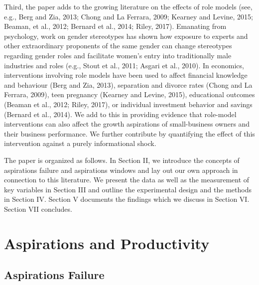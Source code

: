 \documentclass[11.5pt]{article}
\begin{document}
Third, the paper adds to the growing literature on the effects of role models (see, e.g., Berg and Zia, 2013; Chong and La Ferrara, 2009; Kearney and Levine, 2015; Beaman, et al., 2012; Bernard et al., 2014; Riley, 2017). Emanating from psychology, work on gender stereotypes has shown how exposure to experts and other extraordinary proponents of the same gender  can change stereotypes regarding gender roles and facilitate women's entry into traditionally male industries and roles (e.g., Stout et al., 2011; Asgari et al., 2010). In economics, interventions involving role models have been used to affect financial knowledge and behaviour (Berg and Zia, 2013), separation and divorce rates (Chong and La Ferrara, 2009), teen pregnancy (Kearney and Levine, 2015), educational outcomes (Beaman et al., 2012; Riley, 2017), or individual investment behavior and savings (Bernard et al., 2014). We add to this in providing evidence that role-model interventions can also affect the growth aspirations of small-business owners and their business performance. We further contribute by quantifying the effect of this intervention against a purely informational shock.

The paper is organized as follows. In Section II, we introduce the concepts of aspirations failure and aspirations windows and lay out our own approach in connection to this literature. We present the data as well as the measurement of key variables in Section III and outline the experimental design and the methods in Section IV. Section V documents the findings which we discuss in Section VI. Section VII concludes.

\section{Aspirations and Productivity} \label{sec:hypotheses}

\subsection{Aspirations Failure}
\end{document}
